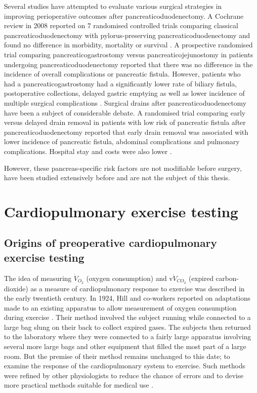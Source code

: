 Several studies have attempted to evaluate various surgical strategies in improving perioperative outcomes after pancreaticoduodenectomy. 
A Cochrane review in 2008 reported on 7 randomised controlled trials comparing classical pancreaticoduodenectomy with pylorus-preserving pancreaticoduodenectomy  and found no difference in morbidity, mortality or survival \parencite{diener_pancreaticoduodenectomy_2008}. 
A prospective randomised trial comparing pancreaticogastrostomy versus pancreaticojejunostomy in patients undergoing pancreaticoduodenectomy reported that there was no difference in the incidence of overall complications or pancreatic fistula. 
However, patients who had a pancreaticogastrostomy had a significantly lower rate of biliary fistula, postoperative collections, delayed gastric emptying as well as lower incidence of multiple surgical complications \parencite{bassi_reconstruction_2005}.
Surgical drains after pancreaticoduodenectomy have been a subject of considerable debate. 
A randomised trial comparing early versus delayed drain removal in patients with low risk of pancreatic fistula after pancreaticoduodenectomy reported that early drain removal was associated with lower incidence of pancreatic fistula, abdominal complications and pulmonary complications. 
Hospital stay and costs were also lower \parencite{bassi_early_2010}.

However, these pancreas-specific risk factors are not modifiable before surgery, have been studied extensively before and are not the subject of this thesis.

\section{Cardiopulmonary exercise testing}

\subsection{Origins of preoperative cardiopulmonary exercise testing}

The idea of measuring $\dot{V}_{O_2}$ (oxygen consumption) and v$\dot{V}_{CO_2}$ (expired carbon-dioxide) as a measure of cardiopulmonary response to exercise was described in the early twentieth century. 
In 1924, Hill and co-workers reported on adaptations made to an existing apparatus to allow measurement of oxygen consumption during exercise \parencite{hill_muscular_1924}. 
Their method involved the subject running while connected to a large bag slung on their back to collect expired gases. 
The subjects then returned to the laboratory where they were connected to a fairly large apparatus involving several more large bags and other equipment that filled the most part of a large room. 
But the premise of their method remains unchanged to this date; to examine the response of the cardiopulmonary system to exercise.
Such methods were refined by other physiologists to reduce the chance of errors and to devise more practical methods suitable for medical use \parencite{katz_ln_metabolic_1934, sutton_estimation_1940}.

